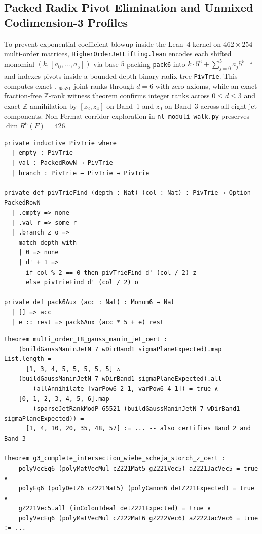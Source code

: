 \documentclass[11pt,a4paper]{article}
\begin{document}
\subsection{Packed Radix Pivot Elimination and Unmixed Codimension-3 Profiles}

To prevent exponential coefficient blowup inside the Lean~4 kernel on $462 \times 254$ multi-order matrices, \texttt{HigherOrderJetLifting.lean} encodes each shifted monomial $(k, [a_0,\dots,a_5])$ via base-$5$ packing \texttt{pack6} into $k \cdot 5^6 + \sum_{j=0}^5 a_j 5^{5-j}$ and indexes pivots inside a bounded-depth binary radix tree \texttt{PivTrie}. This computes exact $\mathbb{F}_{65521}$ joint ranks through $d = 6$ with zero axioms, while an exact fraction-free $\mathbb{Z}$-rank witness theorem confirms integer ranks across $0 \le d \le 3$ and exact $\mathbb{Z}$-annihilation by $[z_2, z_4]$ on Band~1 and $z_0$ on Band~3 across all eight jet components. Non-Fermat corridor exploration in \texttt{nl\_moduli\_walk.py} preserves $\dim R^6(F) = 426$.

\begin{lstlisting}[caption={Binary radix pivot trie and base-$5$ packing in \texttt{HigherOrderJetLifting.lean}.}]
private inductive PivTrie where
  | empty : PivTrie
  | val : PackedRowN → PivTrie
  | branch : PivTrie → PivTrie → PivTrie

private def pivTrieFind (depth : Nat) (col : Nat) : PivTrie → Option PackedRowN
  | .empty => none
  | .val r => some r
  | .branch z o =>
    match depth with
    | 0 => none
    | d' + 1 =>
      if col % 2 == 0 then pivTrieFind d' (col / 2) z
      else pivTrieFind d' (col / 2) o

private def pack6Aux (acc : Nat) : Monom6 → Nat
  | [] => acc
  | e :: rest => pack6Aux (acc * 5 + e) rest
\end{lstlisting}

\begin{lstlisting}[caption={Order-8 Gauss--Manin jet, exact $\mathbb{Z}$-rank, and CI quotient theorems in \texttt{HigherOrderJetLifting.lean}.}]
theorem multi_order_t8_gauss_manin_jet_cert :
    (buildGaussManinJetN 7 wDirBand1 sigmaPlaneExpected).map List.length =
      [1, 3, 4, 5, 5, 5, 5, 5] ∧
    (buildGaussManinJetN 7 wDirBand1 sigmaPlaneExpected).all
        (allAnnihilate [varPow6 2 1, varPow6 4 1]) = true ∧
    [0, 1, 2, 3, 4, 5, 6].map
        (sparseJetRankModP 65521 (buildGaussManinJetN 7 wDirBand1 sigmaPlaneExpected)) =
      [1, 4, 10, 20, 35, 48, 57] := ... -- also certifies Band 2 and Band 3

theorem g3_complete_intersection_wiebe_scheja_storch_z_cert :
    polyVecEq6 (polyMatVecMul cZ221Mat5 gZ221Vec5) aZ221JacVec5 = true ∧
    polyEq6 (polyDetZ6 cZ221Mat5) (polyCanon6 detZ221Expected) = true ∧
    gZ221Vec5.all (inColonIdeal detZ221Expected) = true ∧
    polyVecEq6 (polyMatVecMul cZ222Mat6 gZ222Vec6) aZ222JacVec6 = true := ...
\end{lstlisting}
\end{document}
